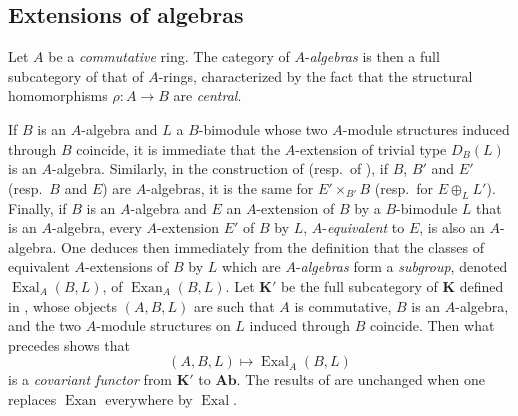 \subsection{Extensions of algebras}
\label{subsection:0.18.4}

\begin{env}[18.4.1]
\label{0.18.4.1}
Let $A$ be a \emph{commutative} ring.
The category of $A$-\emph{algebras} is then a full subcategory of that of $A$-rings, characterized by the fact that the structural homomorphisms $\rho:A\to B$ are \emph{central}.

If $B$ is an $A$-algebra and $L$ a $B$-bimodule whose two $A$-module structures induced through $B$ coincide, it is immediate that the $A$-extension of trivial type $D_B(L)$ is an $A$-algebra.
Similarly, in the construction of  (resp.\ of ), if $B$, $B'$ and $E'$ (resp.\ $B$ and $E$) are $A$-algebras, it is the same for $E'\times_{B'} B$ (resp.\ for $E\oplus_L L'$).
Finally, if $B$ is an $A$-algebra and $E$ an $A$-extension of $B$ by a $B$-bimodule $L$ that is an $A$-algebra, every $A$-extension $E'$ of $B$ by $L$, $A$-\emph{equivalent} to $E$, is also an $A$-algebra.
One deduces then immediately from the definition  that the classes of equivalent $A$-extensions of $B$ by $L$ which are $A$-\emph{algebras} form a \emph{subgroup}, denoted $\operatorname{Exal}_A(B,L)$, of $\operatorname{Exan}_A(B,L)$.
Let $\boldsymbol{K}'$ be the full subcategory of $\boldsymbol{K}$ defined in , whose objects $(A,B,L)$ are such that $A$ is commutative, $B$ is an $A$-algebra, and the two $A$-module structures on $L$ induced through $B$ coincide.
Then what precedes shows that
\[
  (A,B,L)\mapsto\operatorname{Exal}_A(B,L)
\]
is a \emph{covariant functor} from $\boldsymbol{K}'$ to $\boldsymbol{Ab}$.
The results of  are unchanged when one replaces $\operatorname{Exan}$ everywhere by $\operatorname{Exal}$.
\end{env}


